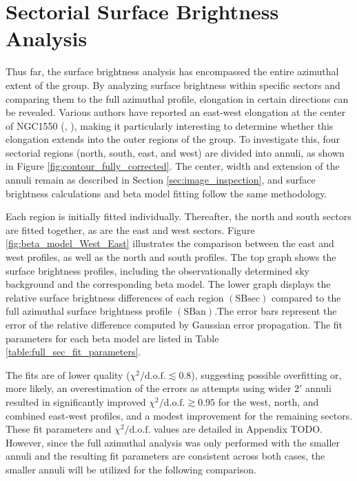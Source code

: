 \section{Sectorial Surface Brightness Analysis}
Thus far, the surface brightness analysis has encompassed the entire azimuthal extent of the group. By analyzing surface brightness within specific sectors and comparing them to the full azimuthal profile, elongation in certain directions can be revealed. Various authors have reported an east-west elongation at the center of NGC1550 (\cite{Sun_2003}, \cite{Kolokythas_2020}), making it particularly interesting to determine whether this elongation extends into the outer regions of the group. To investigate this, four sectorial regions (north, south, east, and west) are divided into annuli, as shown in Figure \ref{fig:contour_fully_corrected}. The center, width and extension of the annuli remain as described in Section \ref{sec:image_inspection}, and surface brightness calculations and beta model fitting follow the same methodology.

Each region is initially fitted individually. Thereafter, the north and south sectors are fitted together, as are the east and west sectors. Figure \ref{fig:beta_model_West_East} illustrates the comparison between the east and west profiles, as well as the north and south profiles. The top graph shows the surface brightness profiles, including the observationally determined sky background and the corresponding beta model. The lower graph displays the relative surface brightness differences of each region \((\text{SB}\text{sec})\) compared to the full azimuthal surface brightness profile \((\text{SB}\text{an})\).The error bars represent the error of the relative difference computed by Gaussian error propagation. The fit parameters for each beta model are listed in Table \ref{table:full_sec_fit_parameters}. 

The fits are of lower quality ($\chi^2 / \text{d.o.f.} \lesssim 0.8$), suggesting possible overfitting or, more likely, an overestimation of the errors as attempts using wider $2'$ annuli resulted in significantly improved $\chi^2 / \text{d.o.f.} \gtrsim 0.95$ for the west, north, and combined east-west profiles, and a modest improvement for the remaining sectors. These fit parameters and $\chi^2 / \text{d.o.f.}$ values are detailed in Appendix TODO. However, since the full azimuthal analysis was only performed with the smaller annuli and the resulting fit parameters are consistent across both cases, the smaller annuli will be utilized for the following comparison. 

